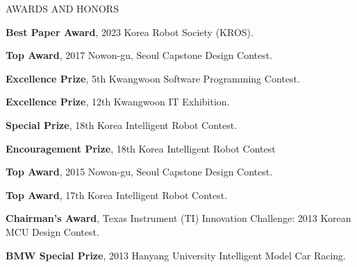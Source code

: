 \begin{rSection}{AWARDS AND HONORS}
    \begin{rSubsection}{}{}{}{}    
        \item \textbf{Best Paper Award}, 2023 Korea Robot Society (KROS).  
    \end{rSubsection}   
    
    \begin{rSubsection}{}{}{}{}               
       \item \textbf{Top Award}, 2017 Nowon-gu, Seoul Capstone Design Contest.
       \item \textbf{Excellence Prize}, 5th Kwangwoon Software Programming Contest.
       \item \textbf{Excellence Prize}, 12th Kwangwoon IT Exhibition.
       \item \textbf{Special Prize}, 18th Korea Intelligent Robot Contest.
       \item \textbf{Encouragement Prize}, 18th Korea Intelligent Robot Contest
       \item \textbf{Top Award}, 2015 Nowon-gu, Seoul Capstone Design Contest.
       \item \textbf{Top Award}, 17th Korea Intelligent Robot Contest.
       \item \textbf{Chairman's Award}, Texas Instrument (TI) Innovation Challenge: 2013 Korean MCU Design Contest.
       \item \textbf{BMW Special Prize}, 2013 Hanyang University Intelligent Model Car Racing.
    \end{rSubsection}    
    
\end{rSection}
